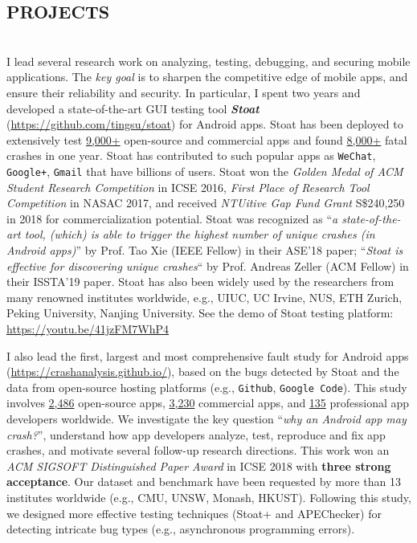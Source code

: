 \documentclass[margin]{res}
\begin{document}
\begin{resume}

\section{PROJECTS}
\\
I lead several research work on analyzing, testing, debugging, and securing mobile applications. The \emph{key goal} is to sharpen the competitive edge of mobile apps, and ensure their reliability and security.
In particular, I spent two years and developed a state-of-the-art GUI testing tool \emph{\textbf{Stoat}} (\url{https://github.com/tingsu/stoat}) for Android apps.
Stoat has been deployed to extensively test \underline{9,000+} open-source and commercial apps and found \underline{8,000+} fatal crashes in one year. Stoat has contributed to such popular apps as \texttt{WeChat}, \texttt{Google+}, \texttt{Gmail} that have billions of users. Stoat won the \emph{Golden Medal of ACM Student Research Competition} in ICSE 2016, \emph{First Place of Research Tool Competition} in NASAC 2017, and received \emph{NTUitive Gap Fund Grant} S\$240,250 in 2018 for commercialization potential. Stoat was recognized as ``\emph{a state-of-the-art tool, (which) is able to trigger the highest number of unique crashes (in Android apps)}'' by Prof. Tao Xie (IEEE Fellow) in their ASE'18 paper; ``\emph{Stoat is effective for discovering unique
crashes}`` by Prof. Andreas Zeller (ACM Fellow) in their ISSTA'19 paper.
Stoat has also been widely used by the researchers from many renowned institutes worldwide, e.g., UIUC, UC Irvine, NUS, ETH Zurich, Peking University, Nanjing University. See the demo of Stoat testing platform: \url{https://youtu.be/41jzFM7WhP4}

I also lead the first, largest and most comprehensive fault study for Android apps (\url{https://crashanalysis.github.io/}), based on the bugs detected by Stoat and the data from open-source hosting platforms (e.g., \texttt{Github}, \texttt{Google Code}). This study involves \underline{2,486} open-source apps, \underline{3,230} commercial apps, and \underline{135} professional app developers worldwide. We investigate the key question ``\emph{why an Android app may crash?}'', understand how app developers analyze, test, reproduce and fix app crashes, and motivate several follow-up research directions. This work won an \emph{ACM SIGSOFT Distinguished Paper Award} in ICSE 2018 with \textbf{three strong acceptance}. Our dataset and benchmark have been requested by more than 13 institutes worldwide (e.g., CMU, UNSW, Monash, HKUST). Following this study, we designed more effective testing techniques (Stoat+ and APEChecker) for detecting intricate bug types (e.g., asynchronous programming errors).


\end{resume}
\end{document}
